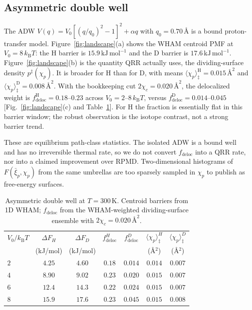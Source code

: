 \documentclass[%
 aip,
 jcp,
 amsmath,amssymb,
 reprint,
 floatfix,
]{revtex4-2}
\newcommand{\avg}[1]{\langle #1 \rangle}
\newcommand{\xip}{\bar{\xi}_p}
\newcommand{\chip}{\chi_p}
\newcommand{\kB}{k_{\mathrm{B}}}
\begin{document}
\subsection{Asymmetric double well}

The ADW $V(q)=V_0[(q/q_0)^2-1]^2+\alpha q$ with $q_0=0.70\,\text{\AA}$ is a bound proton-transfer model. Figure~\ref{fig:landscape}(a) shows the WHAM centroid PMF at $V_0=8\,\kB T$: the H barrier is $15.9\,\mathrm{kJ\,mol}^{-1}$ and the D barrier is $17.6\,\mathrm{kJ\,mol}^{-1}$. Figure~\ref{fig:landscape}(b) is the quantity QRR actually uses, the dividing-surface density $p^\ddagger(\chip)$. It is broader for H than for D, with means $\avg{\chip}_\ddagger^{\mathrm{H}}=0.015\,\text{\AA}^2$ and $\avg{\chip}_\ddagger^{\mathrm{D}}=0.008\,\text{\AA}^2$. With the bookkeeping cut $2\chi_c=0.020\,\text{\AA}^2$, the delocalized weight is $f_{\mathrm{deloc}}^{\mathrm{H}}=0.18$--$0.23$ across $V_0=2$--$8\,\kB T$, versus $f_{\mathrm{deloc}}^{\mathrm{D}}=0.014$--$0.045$ [Fig.~\ref{fig:landscape}(c) and Table~\ref{tab:adw}]. For H the fraction is essentially flat in this barrier window; the robust observation is the isotope contrast, not a strong barrier trend.

These are equilibrium path-class statistics. The isolated ADW is a bound well and has no irreversible thermal rate, so we do not convert $f_{\mathrm{deloc}}$ into a QRR rate, nor into a claimed improvement over RPMD. Two-dimensional histograms of $F(\xip,\chip)$ from the same umbrellas are too sparsely sampled in $\chip$ to publish as free-energy surfaces.

\begin{table}[htbp]
\caption{\label{tab:adw}
Asymmetric double well at $T=300\,\mathrm{K}$.
Centroid barriers from 1D WHAM; $f_{\mathrm{deloc}}$ from the WHAM-weighted dividing-surface ensemble with $2\chi_c=0.020\,\text{\AA}^2$.
}
\begin{ruledtabular}
\begin{tabular}{lcccccc}
$V_0/\kB T$ & $\Delta F_H$ & $\Delta F_D$ & $f_{\mathrm{deloc}}^H$ & $f_{\mathrm{deloc}}^D$ & $\avg{\chip}_\ddagger^H$ & $\avg{\chip}_\ddagger^D$ \\
 & (kJ/mol) & (kJ/mol) & & & (\AA$^2$) & (\AA$^2$) \\
\hline
$2$ & $4.25$ & $4.60$ & $0.18$ & $0.014$ & $0.014$ & $0.007$ \\
$4$ & $8.90$ & $9.02$ & $0.23$ & $0.020$ & $0.015$ & $0.007$ \\
$6$ & $12.4$ & $14.3$ & $0.22$ & $0.024$ & $0.015$ & $0.007$ \\
$8$ & $15.9$ & $17.6$ & $0.23$ & $0.045$ & $0.015$ & $0.008$ \\
\end{tabular}
\end{ruledtabular}
\end{table}
\end{document}
